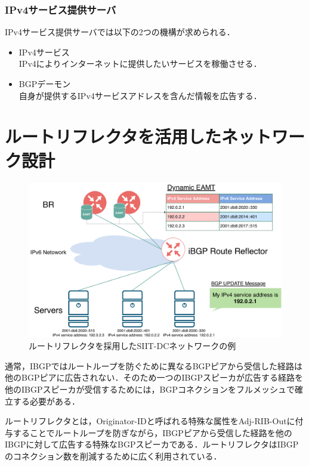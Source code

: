 {\subsubsection{IPv4サービス提供サーバ}
IPv4サービス提供サーバでは以下の2つの機構が求められる．
\begin{itemize}
    \item IPv4サービス\\
    IPv4によりインターネットに提供したいサービスを稼働させる．
    \item BGPデーモン\\
    自身が提供するIPv4サービスアドレスを含んだ情報を広告する．
\end{itemize}


\section{ルートリフレクタを活用したネットワーク設計}
\label{proposal:network_rr}
\begin{figure}[h]
    \begin{center}
    \includegraphics[width=15cm,pagebox=cropbox,clip]{img/proposal_method_network_rr.pdf}
    \end{center}
    \caption{ルートリフレクタを採用したSIIT-DCネットワークの例}
    \label{fig:proposal_method_network_rr}
\end{figure}

通常，IBGPではルートループを防ぐために異なるBGPピアから受信した経路は他のBGPピアに広告されない．そのため一つのIBGPスピーカが広告する経路を他のIBGPスピーカが受信するためには，BGPコネクションをフルメッシュで確立する必要がある\cite{vutukuru2005construct}．

ルートリフレクタとは，Originator-IDと呼ばれる特殊な属性をAdj-RIB-Outに付与することでルートループを防ぎながら，IBGPピアから受信した経路を他のIBGPに対して広告する特殊なBGPスピーカである\cite{RFC4456}．ルートリフレクタはIBGPのコネクション数を削減するために広く利用されている．

}

